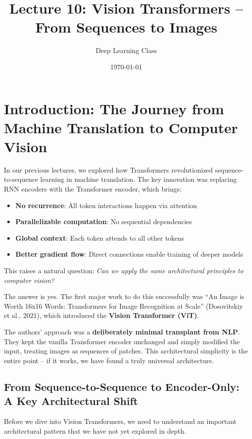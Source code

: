 \documentclass{article}
\title{Lecture 10: Vision Transformers -- From Sequences to Images}
\author{Deep Learning Class}
\date{\today}
\begin{document}
\maketitle

\section{Introduction: The Journey from Machine Translation to Computer Vision}

In our previous lectures, we explored how Transformers revolutionized sequence-to-sequence learning in machine translation. The key innovation was replacing RNN encoders with the Transformer encoder, which brings:

\begin{itemize}
\item \textbf{No recurrence}: All token interactions happen via attention
\item \textbf{Parallelizable computation}: No sequential dependencies
\item \textbf{Global context}: Each token attends to all other tokens
\item \textbf{Better gradient flow}: Direct connections enable training of deeper models
\end{itemize}

This raises a natural question: \textit{Can we apply the same architectural principles to computer vision?}

The answer is yes. The first major work to do this successfully was ``An Image is Worth 16x16 Words: Transformers for Image Recognition at Scale'' (Dosovitskiy et al., 2021), which introduced the \textbf{Vision Transformer (ViT)}.

The authors' approach was a \textbf{deliberately minimal transplant from NLP}. They kept the vanilla Transformer encoder unchanged and simply modified the input, treating images as sequences of patches. This architectural simplicity is the entire point -- if it works, we have found a truly universal architecture.

\subsection{From Sequence-to-Sequence to Encoder-Only: A Key Architectural Shift}

Before we dive into Vision Transformers, we need to understand an important architectural pattern that we have not yet explored in depth.
\end{document}
